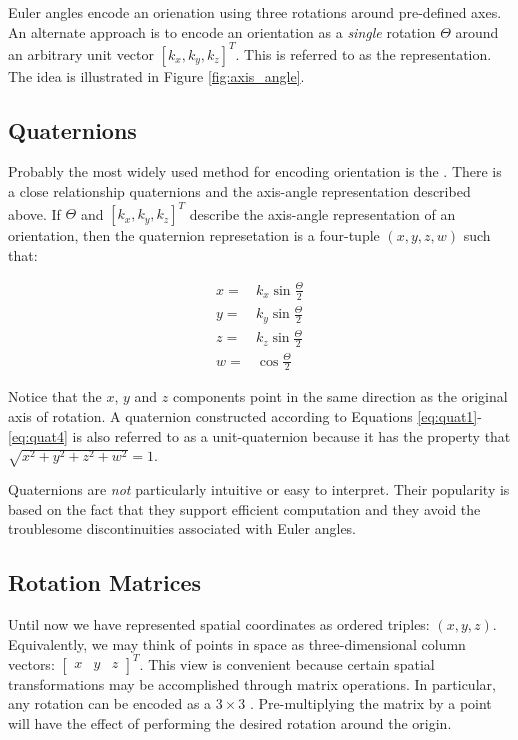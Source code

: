 Euler angles encode an orienation using three rotations around
pre-defined axes.  An alternate approach is to encode an orientation
as a \emph{single} rotation $\Theta$ around an arbitrary unit vector
$[k_x,k_y,k_z]^T$.
This is referred to as the  representation.  The
idea is illustrated in Figure \ref{fig:axis_angle}.

\subsection{Quaternions}

Probably the most widely used method for encoding orientation is the
.  There is a close relationship quaternions and the
axis-angle representation described above.  If $\Theta$ and
$[k_x,k_y,k_z]^T$ describe the axis-angle representation of an
orientation, then the quaternion represetation is a four-tuple $(x,
y, z, w)$ such that:

\begin{align} 
x =&  k_x \sin{\frac{\Theta}{2}}\label{eq:quat1}\\
y =&  k_y \sin{\frac{\Theta}{2}}\label{eq:quat2}\\
z =&  k_z \sin{\frac{\Theta}{2}}\label{eq:quat3}\\
w =& \cos{\frac{\Theta}{2}} \label{eq:quat4}
\end{align}

Notice that the $x$, $y$ and $z$ components point in the same
direction as the original axis of rotation.  A quaternion constructed
according to Equations \ref{eq:quat1}-\ref{eq:quat4} is also referred
to as a unit-quaternion because it has the property that $\sqrt{ x^2 +
  y^2 + z^2 + w^2} = 1$.

Quaternions are \emph{not} particularly intuitive or easy to
interpret. Their popularity is based on the fact that they support
efficient computation and they avoid the troublesome discontinuities
associated with Euler angles.


\subsection{Rotation Matrices}

Until now we have represented spatial coordinates as ordered triples:
$(x, y, z)$. Equivalently, we may think of points in space as
three-dimensional column vectors: $\begin{bmatrix}x& y&
  z\end{bmatrix}^T$.  This view is convenient because certain spatial
  transformations may be accomplished through matrix operations.  In
  particular, any rotation can be encoded as a $3\times3$
  .  Pre-multiplying the matrix by a point will
  have the effect of performing the desired rotation around the
  origin.

